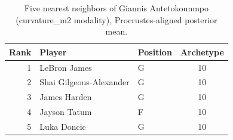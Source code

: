 \begin{table}[htbp]
  \centering\small
  \begin{tabular}{rllc}
    \toprule
    Rank & Player & Position & Archetype \\
    \midrule
    1 & LeBron James & G & 10 \\
    2 & Shai Gilgeous-Alexander & G & 10 \\
    3 & James Harden & G & 10 \\
    4 & Jayson Tatum & F & 10 \\
    5 & Luka Doncic & G & 10 \\
    \bottomrule
  \end{tabular}
  \caption{Five nearest neighbors of Giannis Antetokounmpo (curvature_m2 modality), Procrustes-aligned posterior mean.}
  \label{tab:Giannis_Antetokounmpo_neighbors_curvature_m2}
\end{table}

